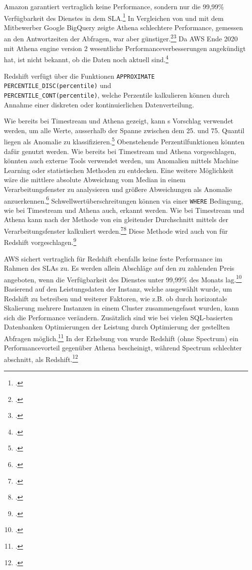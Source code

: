 Amazon garantiert vertraglich keine Performance, sondern nur die 99,99\% Verfügbarkeit des Dienstes in dem \ac{SLA}.\footcite[Vgl.][]{AmazonWebServicesInc..2019c} In Vergleichen von \citeauthor{Levy.2019} und \citeauthor{Khadtare.2018} mit dem Mitbewerber Google BigQuery zeigte Athena schlechtere Performance, gemessen an den Antwortzeiten der Abfragen, war aber günstiger.\footcite[Vgl.][]{Levy.2019}\nzitat\footcite[Vgl.][]{Khadtare.2018} Da \ac{AWS} Ende 2020 mit Athena engine version 2 wesentliche Performanceverbesserungen angekündigt hat, ist nicht bekannt, ob die Daten noch aktuell sind.\footcite[Vgl.][]{AmazonWebServicesInc..2020c}

\label{anhang:vergleich-redshift}

Redshift verfügt über die Funktionen \texttt{APPROXIMATE PERCENTILE_DISC(percentile)} und \\ \texttt{PERCENTILE_CONT(percentile)}, welche Perzentile kalkulieren können durch Annahme einer diskreten oder kontinuierlichen Datenverteilung.

Wie bereits bei Timestream und Athena gezeigt, kann \citeauthor{Salgado.2019}s Vorschlag verwendet werden, um alle Werte, ausserhalb der Spanne zwischen dem 25. und 75. Quantil liegen als Anomalie zu klassifizieren.\footcite[Vgl.][]{Salgado.2019} Obenstehende Perzentilfunktionen könnten dafür genutzt werden. Wie bereits bei Timestream und Athena vorgeschlagen, könnten auch externe Tools verwendet werden, um Anomalien mittels Machine Learning oder statistischen Methoden zu entdecken. Eine weitere Möglichkeit wäre die mittlere absolute Abweichung vom Median in einem Verarbeitungsfenster zu analysieren und größere Abweichungen als Anomalie anzuerkennen.\footcite[Vgl.][]{Peak.2017}
Schwellwertüberschreitungen können via einer \texttt{WHERE} Bedingung, wie bei Timestream und Athena auch, erkannt werden.
Wie bei Timestream und Athena kann nach der Methode von \citeauthor{Ross.2020} ein gleitender Durchschnitt mittels der Verarbeitungsfenster kalkuliert werden.\footcite[Vgl.][]{Ross.2020}\nzitat\footcite[Vgl.][]{Ubiq.o.J.} Diese Methode wird auch von \citeauthor{Ubiq.o.J.} für Redshift vorgeschlagen.\footcite[Vgl.][]{Ubiq.o.J.}

\ac{AWS} sichert vertraglich für Redshift ebenfalls keine feste Performance im Rahmen des \acp{SLA} zu. Es werden allein Abschläge auf den zu zahlenden Preis angeboten, wenn die Verfügbarkeit des Dienstes unter 99,99\% des Monats lag.\footcite[Vgl.][]{AmazonWebServicesInc..2019b} Basierend auf den Leistungsdaten der Instanz, welche ausgewählt wurde, um Redshift zu betreiben und weiterer Faktoren, wie z.B. ob durch horizontale Skalierung mehrere Instanzen in einem Cluster zusammengefasst wurden, kann sich die Performance verändern. Zusätzlich sind wie bei vielen \ac{SQL}-basierten Datenbanken Optimierungen der Leistung durch Optimierung der gestellten Abfragen möglich.\footcite[Vgl.][]{AmazonWebServicesInc..o.J.ab} In der Erhebung von \citeauthor{Tan.2019} wurde Redshift (ohne Spectrum) ein Performancevorteil gegenüber Athena bescheinigt, während Spectrum schlechter abschnitt, als Redshift.\footcite[Vgl.][2176]{Tan.2019}

